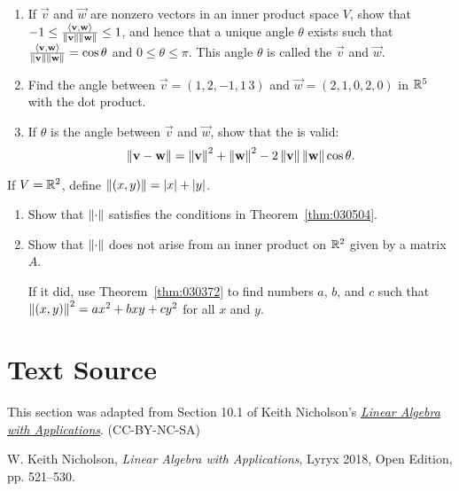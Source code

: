 \documentclass{ximera}
\begin{document}
\begin{problem} \label{ex:10_1_31}
\begin{enumerate} 
\item If $\vec{v}$ and $\vec{w}$ are nonzero vectors in an inner product space $V$, show that
$-1 \leq \frac{\langle \mathbf{v}, \mathbf{w} \rangle}{\left\lVert \mathbf{v} \right\rVert \left\lVert \mathbf{w} \right\rVert} \leq 1$, and hence that a unique angle $\theta$ exists such that \newline $\frac{\langle \mathbf{v}, \mathbf{w} \rangle}{\left\lVert \mathbf{v} \right\rVert \left\lVert \mathbf{w} \right\rVert} = \cos \theta$ and $0 \leq \theta \leq \pi$. This angle $\theta$ is called the
 $\vec{v}$ and $\vec{w}$.

\item Find the angle between $\vec{v} = (1, 2, -1, 1\, 3)$ and $\vec{w} = (2, 1, 0, 2, 0)$ in $\mathbb{R}^5$ with the dot product.

\item If $\theta$ is the angle between $\vec{v}$ and $\vec{w}$, show that the  is valid:
\begin{equation*}
\left\lVert \mathbf{v} - \mathbf{w} \right\rVert = \left\lVert \mathbf{v} \right\rVert ^2 + \left\lVert \mathbf{w} \right\rVert ^2 - 2\left\lVert \mathbf{v} \right\rVert \left\lVert \mathbf{w} \right\rVert \cos \theta.
\end{equation*}
\end{enumerate}
\end{problem}

\begin{problem}\label{prob:inner_prod_32}
If $V = \mathbb{R}^2$, define $\left\lVert(x, y)\right\rVert = |x| + |y|$.

\begin{enumerate} 
\item Show that $\left\lVert\cdot\right\rVert$ satisfies the conditions in Theorem~\ref{thm:030504}.

\item Show that $\left\lVert\cdot\right\rVert$ does not arise from an inner product on $\mathbb{R}^2$ given by a matrix $A$. 
\begin{hint}
    If it did, use Theorem~\ref{thm:030372} to find numbers $a$, $b$, and $c$ such that $\left\lVert(x, y)\right\rVert^{2} = ax^{2} + bxy + cy^{2}$ for all $x$ and $y$.
\end{hint}

\end{enumerate}
\end{problem}

\section*{Text Source} This section was adapted from Section 10.1 of Keith Nicholson's \href{https://open.umn.edu/opentextbooks/textbooks/linear-algebra-with-applications}{\it Linear Algebra with Applications}. (CC-BY-NC-SA)

W. Keith Nicholson, {\it Linear Algebra with Applications}, Lyryx 2018, Open Edition, pp. 521--530.
\end{document}
